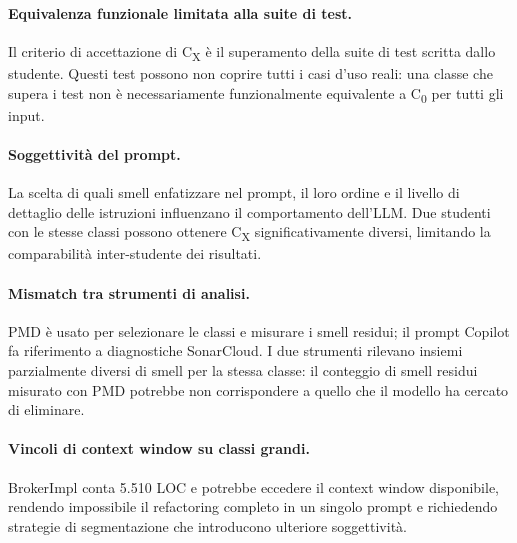 \paragraph{Equivalenza funzionale limitata alla suite di test.}
Il criterio di accettazione di C\textsubscript{X} è il superamento della suite di
test scritta dallo studente. Questi test possono non coprire tutti i casi d'uso reali:
una classe che supera i test non è necessariamente funzionalmente equivalente a
C\textsubscript{0} per tutti gli input.

\paragraph{Soggettività del prompt.}
La scelta di quali smell enfatizzare nel prompt, il loro ordine e il livello di dettaglio
delle istruzioni influenzano il comportamento dell'LLM. Due studenti con le stesse classi
possono ottenere C\textsubscript{X} significativamente diversi, limitando la
comparabilità inter-studente dei risultati.

\paragraph{Mismatch tra strumenti di analisi.}
PMD è usato per selezionare le classi e misurare i smell residui; il prompt Copilot fa
riferimento a diagnostiche SonarCloud. I due strumenti rilevano insiemi parzialmente
diversi di smell per la stessa classe: il conteggio di smell residui misurato con PMD
potrebbe non corrispondere a quello che il modello ha cercato di eliminare.

\paragraph{Vincoli di context window su classi grandi.}
BrokerImpl conta 5.510 LOC e potrebbe eccedere il context window disponibile,
rendendo impossibile il refactoring completo in un singolo prompt e richiedendo
strategie di segmentazione che introducono ulteriore soggettività.
